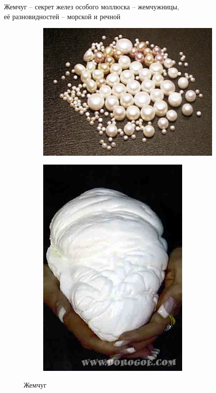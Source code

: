 \documentclass[_Banking_p3.tex]{subfiles}
\begin{document}
\begin{frame}{Жемчуг }{– секрет желез особого моллюска – жемчужницы,\\ её разновидностей – морской и речной}
\begin{figure}	
	\centering
	\begin{subfigure}[t]{4.3cm}
		\centering
		\includegraphics[scale=0.45]{img/pearls.png}
	\caption{}\label{fig:pearls}	
	\end{subfigure}
	\quad
	\begin{subfigure}[t]{4.3cm}
		\centering
		\includegraphics[scale=0.4]{img/pearl_big.png}
		\caption{}\label{fig:pearl_big}
	\end{subfigure}
	\caption{Жемчуг}\label{fig:pearls1}
\end{figure}
\end{frame}
\end{document}
